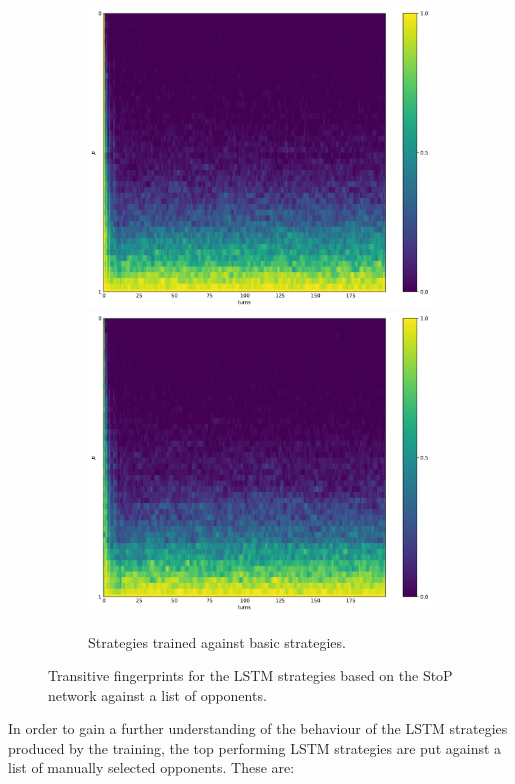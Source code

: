 \begin{figure}[!htbp]
\begin{subfigure}{\textwidth}
        \includegraphics[width=.3\textwidth]{src/chapters/07/img/default_basic_classification_1.pdf}
        \includegraphics[width=.3\textwidth]{src/chapters/07/img/default_basic_classification_0_78.pdf}
        \caption{Strategies trained against basic strategies.}
    \end{subfigure}
    \caption{Transitive fingerprints for the LSTM strategies based on the StoP
    network against a list of \Random opponents.}\label{fig:transitive_fingerprints_default_s_to_p}
\end{figure}

\newpage

In order to gain a further understanding of the behaviour of the LSTM strategies
produced by the training, the top performing LSTM strategies are put against a
list of manually selected opponents. These are:

